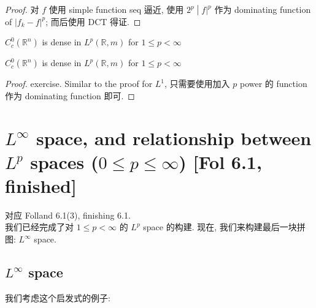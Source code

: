 \documentclass{qlnotes-export}
\begin{document}
\begin{proof}

对 \(f\) 使用 simple function seq 逼近, 使用 \(\left. 2^{p} \middle| f|^{p} \right.\) 作为 dominating function of \(|f_{k} - f|^{p}\); 而后使用 DCT 得证.

\end{proof}

\begin{theorem}{\(C_{c}^{0}({\mathbb{R}}^{n})\) is dense in \(L^{p}({\mathbb{R}},m)\)
for \(1 \leq p < \infty\)}\label{thm-09-l-p-space-and-inequalities-c-c-0-mathbb-r-n-is-dense-in-l-p-mathbb-r-m-for-1-leq-p-infty}

\(C_{c}^{0}({\mathbb{R}}^{n})\) is dense in \(L^{p}({\mathbb{R}},m)\) for \(1 \leq p < \infty\)

\end{theorem}

\begin{proof}

exercise. Similar to the proof for \(L^{1}\), 只需要使用加入 \(p\) power 的 function 作为 dominating function 即可.

\end{proof}

\section{\texorpdfstring{\(L^{\infty}\) space, and relationship between \(L^{p}\) spaces (\(0 \leq p \leq \infty\)) {[}Fol 6.1, finished{]}}{L\^{}\{\textbackslash infty\} space, and relationship between L\^{}\{p\} spaces (0 \textbackslash leq p \textbackslash leq \textbackslash infty) {[}Fol 6.1, finished{]}}}

对应 Folland 6.1(3), finishing 6.1.\\
我们已经完成了对 \(1 \leq p < \infty\) 的 \(L^{p}\) space 的构建. 现在, 我们来构建最后一块拼图: \(L^{\infty}\) space.

\subsection{\texorpdfstring{\(L^{\infty}\) space}{L\^{}\{\textbackslash infty\} space}}\label{linfty-space}

我们考虑这个启发式的例子:
\end{document}
